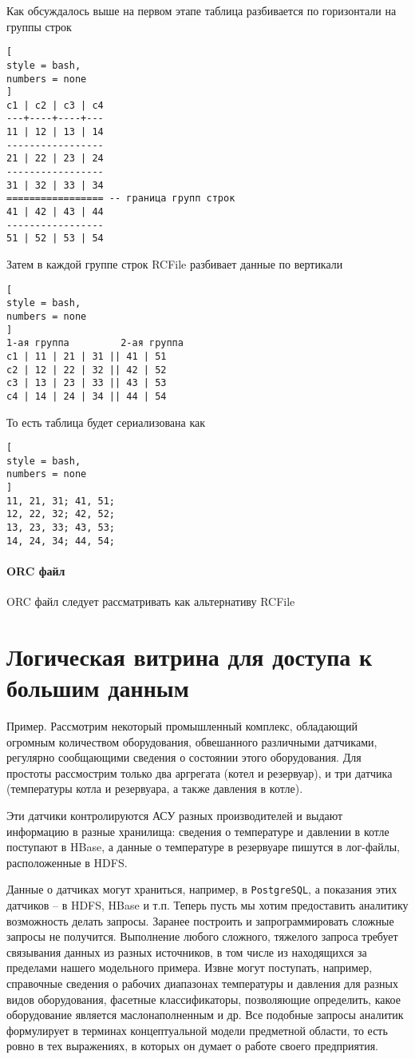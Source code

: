\documentclass[%
	11pt,
	a4paper,
	utf8,
		]{article}
\begin{document}
Как обсуждалось выше на первом этапе таблица разбивается по горизонтали на группы строк
\begin{lstlisting}[
style = bash,
numbers = none	
]
c1 | c2 | c3 | c4
---+----+----+---
11 | 12 | 13 | 14
-----------------
21 | 22 | 23 | 24
-----------------
31 | 32 | 33 | 34
================= -- граница групп строк
41 | 42 | 43 | 44
-----------------
51 | 52 | 53 | 54
\end{lstlisting}

Затем в каждой группе строк RCFile разбивает данные по вертикали
\begin{lstlisting}[
style = bash,
numbers = none	
]
1-ая группа         2-ая группа
с1 | 11 | 21 | 31 || 41 | 51
c2 | 12 | 22 | 32 || 42 | 52
c3 | 13 | 23 | 33 || 43 | 53
c4 | 14 | 24 | 34 || 44 | 54
\end{lstlisting}

То есть таблица будет сериализована как
\begin{lstlisting}[
style = bash,
numbers = none	
]
11, 21, 31; 41, 51;
12, 22, 32; 42, 52;
13, 23, 33; 43, 53;
14, 24, 34; 44, 54;
\end{lstlisting}

\paragraph{ORC файл} ORC файл следует рассматривать как альтернативу RCFile


\section{Логическая витрина для доступа к большим данным}

Пример. Рассмотрим некоторый промышленный комплекс, обладающий огромным количеством оборудования, обвешанного различными датчиками, регулярно сообщающими сведения о состоянии этого оборудования. Для простоты рассмострим только два аргрегата (котел и резервуар), и три датчика (температуры котла и резервуара, а также давления в котле).

Эти датчики контролируются АСУ разных производителей и выдают информацию в разные хранилища: сведения о температуре и давлении в котле поступают в HBase, а данные о температуре в резервуаре пишутся в лог-файлы, расположенные в HDFS.

Данные о датчиках могут храниться, например, в \texttt{PostgreSQL}, а показания этих датчиков -- в HDFS, HBase и т.п. Теперь пусть мы хотим предоставить аналитику возможность делать запросы. Заранее построить и запрограммировать сложные запросы не получится. Выполнение любого сложного, тяжелого запроса требует связывания данных из разных источников, в том числе из находящихся за пределами нашего модельного примера. Извне могут поступать, например, справочные сведения о рабочих диапазонах температуры и давления для разных видов оборудования, фасетные классификаторы, позволяющие определить, какое оборудование является маслонаполненным и др. Все подобные запросы аналитик формулирует в терминах концептуальной модели предметной области, то есть ровно в тех выражениях, в которых он думает о работе своего предприятия.
\end{document}
